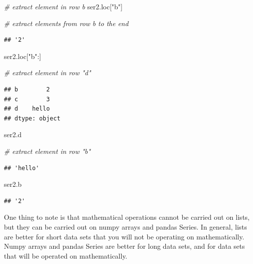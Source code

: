 \documentclass[
]{book}
\newenvironment{Shaded}{\begin{snugshade}}{\end{snugshade}}
\newcommand{\CommentTok}[1]{\textcolor[rgb]{0.56,0.35,0.01}{\textit{#1}}}
\newcommand{\NormalTok}[1]{#1}
\newcommand{\StringTok}[1]{\textcolor[rgb]{0.31,0.60,0.02}{#1}}
\begin{document}
\begin{Shaded}
\begin{Highlighting}[]

\CommentTok{\# extract element in row b}
\NormalTok{ser2.loc[}\StringTok{"b"}\NormalTok{]}

\CommentTok{\# extract elements from row b to the end}
\end{Highlighting}
\end{Shaded}

\begin{verbatim}
## '2'
\end{verbatim}

\begin{Shaded}
\begin{Highlighting}[]
\NormalTok{ser2.loc[}\StringTok{"b"}\NormalTok{:]}

\CommentTok{\# extract element in row "d"}
\end{Highlighting}
\end{Shaded}

\begin{verbatim}
## b        2
## c        3
## d    hello
## dtype: object
\end{verbatim}

\begin{Shaded}
\begin{Highlighting}[]
\NormalTok{ser2.d}

\CommentTok{\# extract element in row "b"}
\end{Highlighting}
\end{Shaded}

\begin{verbatim}
## 'hello'
\end{verbatim}

\begin{Shaded}
\begin{Highlighting}[]
\NormalTok{ser2.b}
\end{Highlighting}
\end{Shaded}

\begin{verbatim}
## '2'
\end{verbatim}

One thing to note is that mathematical operations cannot be carried out on lists, but they can be carried out on numpy arrays and pandas Series. In general, lists are better for short data sets that you will not be operating on mathematically. Numpy arrays and pandas Series are better for long data sets, and for data sets that will be operated on mathematically.
\end{document}
